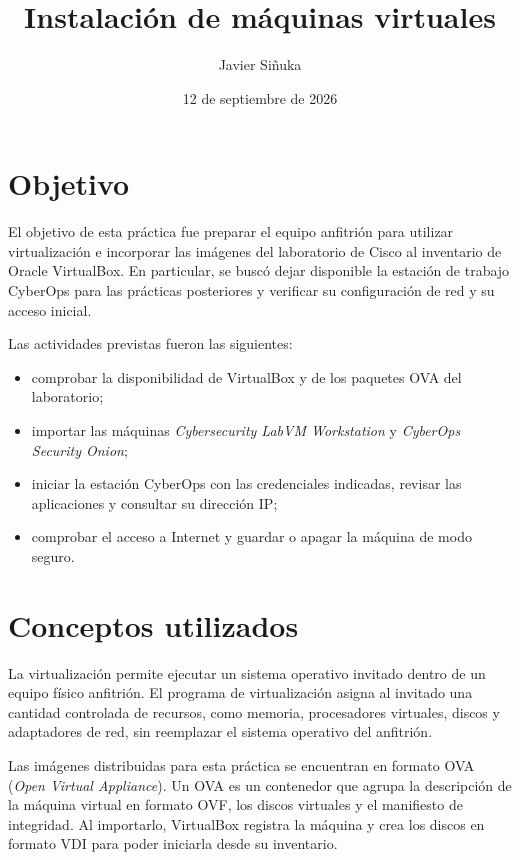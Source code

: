 \documentclass[11pt,a4paper]{article}
\title{Instalación de máquinas virtuales}
\author{Javier Siñuka}
\date{12 de septiembre de 2026}
\begin{document}
\maketitle

\section{Objetivo}

El objetivo de esta práctica fue preparar el equipo anfitrión para utilizar
virtualización e incorporar las imágenes del laboratorio de Cisco al inventario
de Oracle VirtualBox. En particular, se buscó dejar disponible la estación de
trabajo CyberOps para las prácticas posteriores y verificar su configuración de
red y su acceso inicial.

Las actividades previstas fueron las siguientes:

\begin{itemize}[noitemsep]
    \item comprobar la disponibilidad de VirtualBox y de los paquetes OVA del
    laboratorio;
    \item importar las máquinas \emph{Cybersecurity LabVM Workstation} y
    \emph{CyberOps Security Onion};
    \item iniciar la estación CyberOps con las credenciales indicadas, revisar
    las aplicaciones y consultar su dirección IP;
    \item comprobar el acceso a Internet y guardar o apagar la máquina de modo
    seguro.
\end{itemize}

\section{Conceptos utilizados}

La virtualización permite ejecutar un sistema operativo invitado dentro de un
equipo físico anfitrión. El programa de virtualización asigna al invitado una
cantidad controlada de recursos, como memoria, procesadores virtuales, discos y
adaptadores de red, sin reemplazar el sistema operativo del anfitrión.

Las imágenes distribuidas para esta práctica se encuentran en formato OVA
(\emph{Open Virtual Appliance}). Un OVA es un contenedor que agrupa la
descripción de la máquina virtual en formato OVF, los discos virtuales y el
manifiesto de integridad. Al importarlo, VirtualBox registra la máquina y crea
los discos en formato VDI para poder iniciarla desde su inventario.
\end{document}
